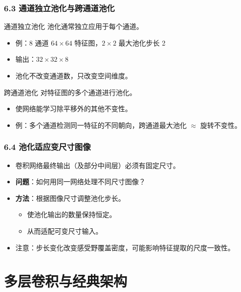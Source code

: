 \documentclass[t,aspectratio=169]{beamer} %
\begin{document}
\begin{frame}
    \frametitle{6.3 通道独立池化与跨通道池化}
    \begin{block}{通道独立池化}
        池化通常\alert{独立应用于每个通道}。
        \begin{itemize}
            \item 例：8 通道 $64 \times 64$ 特征图，$2 \times 2$ 最大池化步长 2
            \item 输出：$32 \times 32 \times 8$
            \item 池化\alert{不改变通道数}，只改变空间维度。
        \end{itemize}
    \end{block}
    \begin{block}{跨通道池化}
        对特征图的\alert{多个通道}进行池化。
        \begin{itemize}
            \item 使网络能\alert{学习}除平移外的其他不变性。
            \item 例：多个通道检测同一特征的不同朝向，跨通道最大池化 $\approx$ \alert{旋转不变性}。
        \end{itemize}
    \end{block}
\end{frame}

\begin{frame}
    \frametitle{6.4 池化适应变尺寸图像}
    \begin{itemize}
        \item 卷积网络最终输出（及部分中间层）必须有\alert{固定尺寸}。
        \item \textbf{问题}：如何用同一网络处理不同尺寸图像？
        \item \textbf{方法}：根据图像尺寸\alert{调整池化步长}。
        \begin{itemize}
            \item 使池化输出的数量保持\alert{恒定}。
            \item 从而适配可变尺寸输入。
        \end{itemize}
        \item 注意：步长变化改变感受野覆盖密度，可能影响特征提取的尺度一致性。
    \end{itemize}
\end{frame}

\section{多层卷积与经典架构}
\end{document}

